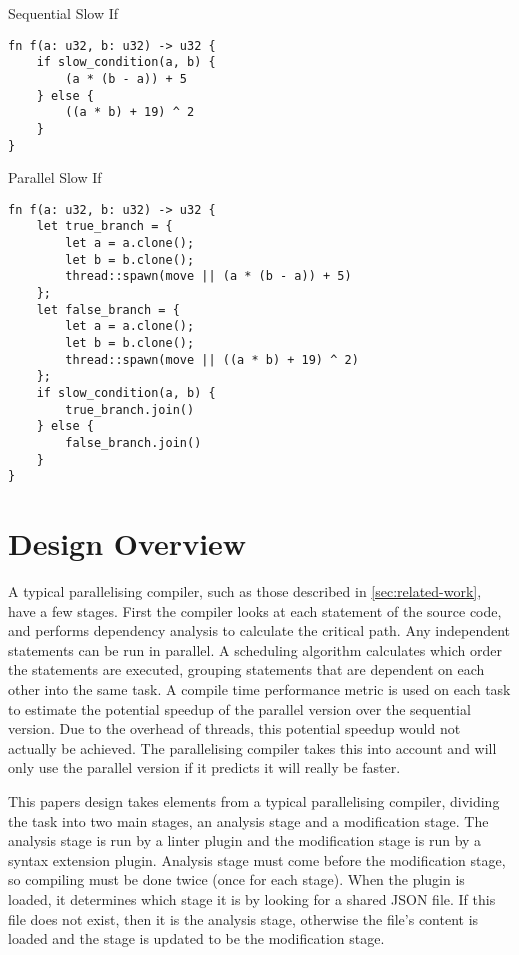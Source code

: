 \documentclass[conference]{IEEEtran}
\begin{document}
\begin{algorithm}
\caption{Sequential Slow If}
\label{code:seq-slowif}
\begin{verbatim}
fn f(a: u32, b: u32) -> u32 {
    if slow_condition(a, b) {
        (a * (b - a)) + 5
    } else {
        ((a * b) + 19) ^ 2
    }
}
\end{verbatim}
\end{algorithm}

\begin{algorithm}
\caption{Parallel Slow If}
\label{code:par-slowif}
\begin{verbatim}
fn f(a: u32, b: u32) -> u32 {
    let true_branch = {
        let a = a.clone();
        let b = b.clone();
        thread::spawn(move || (a * (b - a)) + 5)
    };
    let false_branch = {
        let a = a.clone();
        let b = b.clone();
        thread::spawn(move || ((a * b) + 19) ^ 2)
    };
    if slow_condition(a, b) {
        true_branch.join()
    } else {
        false_branch.join()
    }
}

\end{verbatim}
\end{algorithm}



\section{Design Overview}
\label{sec:design}
A typical parallelising compiler, such as those described in \autoref{sec:related-work}, have a few stages. First the compiler looks at each statement of the source code, and performs dependency analysis to calculate the critical path. Any independent statements can be run in parallel. A scheduling algorithm calculates which order the statements are executed, grouping statements that are dependent on each other into the same task. A compile time performance metric is used on each task to estimate the potential speedup of the parallel version over the sequential version. Due to the overhead of threads, this potential speedup would not actually be achieved. The parallelising compiler takes this into account and will only use the parallel version if it predicts it will really be faster.

This papers design takes elements from a typical parallelising compiler, dividing the task into two main stages, an analysis stage and a modification stage. The analysis stage is run by a linter plugin and the modification stage is run by a syntax extension plugin. Analysis stage must come before the modification stage, so compiling must be done twice (once for each stage).
When the plugin is loaded, it determines which stage it is by looking for a shared JSON file. If this file does not exist, then it is the analysis stage, otherwise the file's content is loaded and the stage is updated to be the modification stage.
\end{document}
